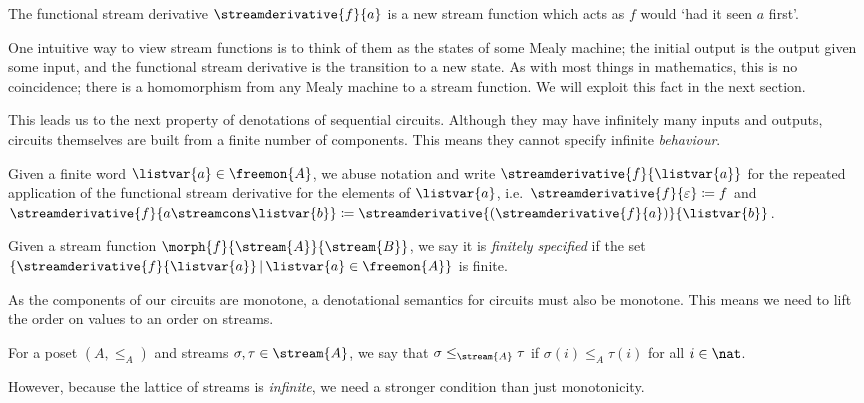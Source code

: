 The functional stream derivative \(\streamderivative{f}{a}\) is a new stream
function which acts as \(f\) would `had it seen \(a\) first'.

\begin{remark}
    One intuitive way to view stream functions is to think of them as the states
    of some Mealy machine; the initial output is the output given some input,
    and the functional stream derivative is the transition to a new state.
    As with most things in mathematics, this is no coincidence; there is a
    homomorphism from any Mealy machine to a stream function.
    We will exploit this fact in the next section.
\end{remark}

This leads us to the next property of denotations of sequential circuits.
Although they may have infinitely many inputs and outputs, circuits themselves
are built from a finite number of components.
This means they cannot specify infinite \emph{behaviour}.

\begin{notation}
    Given a finite word \(\listvar{a} \in \freemon{A}\), we abuse notation
    and write \(\streamderivative{f}{\listvar{a}}\) for the repeated
    application of the functional stream derivative for the elements of
    \(\listvar{a}\), i.e.\ \(
    \streamderivative{f}{\varepsilon} \coloneqq f
    \) and \(
    \streamderivative{f}{a \streamcons \listvar{b}} \coloneqq
    \streamderivative{(\streamderivative{f}{a})}{\listvar{b}}
    \).
\end{notation}

\begin{definition}
    Given a stream function \(\morph{f}{\stream{A}}{\stream{B}}\), we say it is
    \emph{finitely specified} if the set \(\{
    \streamderivative{f}{\listvar{a}} \,|\, \listvar{a} \in \freemon{A}
    \}\) is finite.
\end{definition}

As the components of our circuits are monotone, a denotational semantics for
circuits must also be monotone.
This means we need to lift the order on values to an order on streams.

\begin{notation}
    For a poset \((A, \leq_A)\) and streams \(\sigma,\tau \in \stream{A}\), we
    say that \(\sigma \leq_{\stream{A}} \tau\) if \(\sigma(i) \leq_A \tau(i)\)
    for all \(i \in \nat\).
\end{notation}

However, because the lattice of streams is \emph{infinite}, we need a stronger
condition than just monotonicity.

